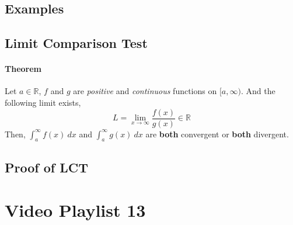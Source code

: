 \documentclass{article}
\newcommand{\R}[0]{\mathbb{R}}
\newcommand{\theorem}[0]{\paragraph{Theorem}}
\begin{document}
\subsection{Examples}

\subsection{Limit Comparison Test}
\theorem Let $a \in \R$, $f$ and $g$ are \emph{positive} and \emph{continuous} functions on $[a, \infty)$. And the following limit exists,
\[
	L = \lim_{x \to \infty}\frac{f(x)}{g(x)} \in \R
\]
Then, $\int_a^{\infty}f(x)\ dx$ and $\int_a^{\infty}g(x)\ dx$ are \textbf{both} convergent or \textbf{both} divergent.

\subsection{Proof of LCT}

\section{Video Playlist 13}
\end{document}
